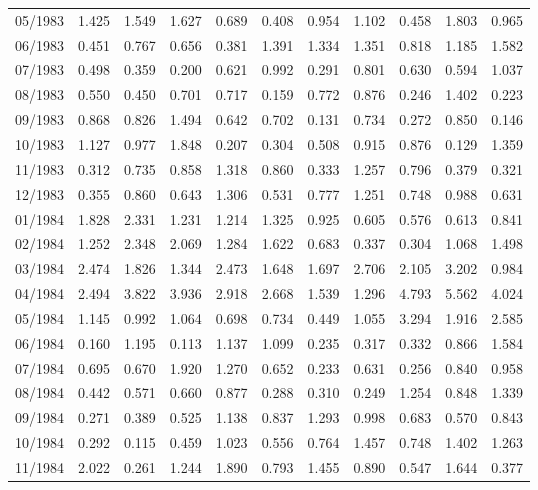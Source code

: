 \begin{tabular}{lrrrrrrrrrr}
05/1983 &  1.425 &  1.549 &  1.627 &  0.689 &  0.408 &  0.954 &  1.102 &  0.458 &  1.803 &  0.965 \\
06/1983 &  0.451 &  0.767 &  0.656 &  0.381 &  1.391 &  1.334 &  1.351 &  0.818 &  1.185 &  1.582 \\
07/1983 &  0.498 &  0.359 &  0.200 &  0.621 &  0.992 &  0.291 &  0.801 &  0.630 &  0.594 &  1.037 \\
08/1983 &  0.550 &  0.450 &  0.701 &  0.717 &  0.159 &  0.772 &  0.876 &  0.246 &  1.402 &  0.223 \\
09/1983 &  0.868 &  0.826 &  1.494 &  0.642 &  0.702 &  0.131 &  0.734 &  0.272 &  0.850 &  0.146 \\
10/1983 &  1.127 &  0.977 &  1.848 &  0.207 &  0.304 &  0.508 &  0.915 &  0.876 &  0.129 &  1.359 \\
11/1983 &  0.312 &  0.735 &  0.858 &  1.318 &  0.860 &  0.333 &  1.257 &  0.796 &  0.379 &  0.321 \\
12/1983 &  0.355 &  0.860 &  0.643 &  1.306 &  0.531 &  0.777 &  1.251 &  0.748 &  0.988 &  0.631 \\
01/1984 &  1.828 &  2.331 &  1.231 &  1.214 &  1.325 &  0.925 &  0.605 &  0.576 &  0.613 &  0.841 \\
02/1984 &  1.252 &  2.348 &  2.069 &  1.284 &  1.622 &  0.683 &  0.337 &  0.304 &  1.068 &  1.498 \\
03/1984 &  2.474 &  1.826 &  1.344 &  2.473 &  1.648 &  1.697 &  2.706 &  2.105 &  3.202 &  0.984 \\
04/1984 &  2.494 &  3.822 &  3.936 &  2.918 &  2.668 &  1.539 &  1.296 &  4.793 &  5.562 &  4.024 \\
05/1984 &  1.145 &  0.992 &  1.064 &  0.698 &  0.734 &  0.449 &  1.055 &  3.294 &  1.916 &  2.585 \\
06/1984 &  0.160 &  1.195 &  0.113 &  1.137 &  1.099 &  0.235 &  0.317 &  0.332 &  0.866 &  1.584 \\
07/1984 &  0.695 &  0.670 &  1.920 &  1.270 &  0.652 &  0.233 &  0.631 &  0.256 &  0.840 &  0.958 \\
08/1984 &  0.442 &  0.571 &  0.660 &  0.877 &  0.288 &  0.310 &  0.249 &  1.254 &  0.848 &  1.339 \\
09/1984 &  0.271 &  0.389 &  0.525 &  1.138 &  0.837 &  1.293 &  0.998 &  0.683 &  0.570 &  0.843 \\
10/1984 &  0.292 &  0.115 &  0.459 &  1.023 &  0.556 &  0.764 &  1.457 &  0.748 &  1.402 &  1.263 \\
11/1984 &  2.022 &  0.261 &  1.244 &  1.890 &  0.793 &  1.455 &  0.890 &  0.547 &  1.644 &  0.377 \\

\end{tabular}
